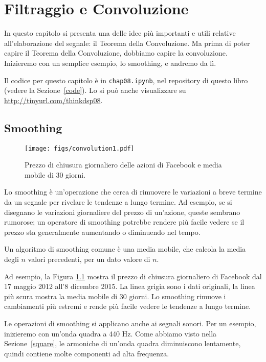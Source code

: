 \documentclass[12pt]{book} \usepackage[width=5.5in,height=8.5in, hmarginratio=3:2,vmarginratio=1:1]{geometry}
\begin{document}
\chapter{Filtraggio e Convoluzione} 

In questo capitolo si presenta una delle idee più importanti e utili relative all'elaborazione del segnale: il Teorema della Convoluzione. Ma prima di poter capire il Teorema della Convoluzione, dobbiamo capire la convoluzione. Inizieremo con un semplice esempio, lo smoothing, e andremo da lì.

Il codice per questo capitolo è in {\tt chap08.ipynb}, nel repository di questo libro (vedere la Sezione~\ref{code}). Lo si può anche visualizzare su \url{http://tinyurl.com/thinkdsp08}.

\section{Smoothing} \label{smoothing} 

\begin{figure} 

\centerline{\texttt{[image: figs/convolution1.pdf]}} \caption{Prezzo di chiusura giornaliero delle azioni di Facebook e media mobile di 30 giorni.} \label{fig.convolution1} \end{figure} 

Lo smoothing è un'operazione che cerca di rimuovere le variazioni a breve termine da un segnale per rivelare le tendenze a lungo termine. Ad esempio, se si disegnano le variazioni giornaliere del prezzo di un'azione, queste sembrano rumorose; un operatore di smoothing potrebbe rendere più facile vedere se il prezzo sta generalmente aumentando o diminuendo nel tempo.

Un algoritmo di smoothing comune è una media mobile, che calcola la media degli $n$ valori precedenti, per un dato valore di $n$.

Ad esempio, la Figura \ref{fig.convolution1} mostra il prezzo di chiusura giornaliero di Facebook dal 17 maggio 2012 all'8 dicembre 2015. La linea grigia sono i dati originali, la linea più scura mostra la media mobile di 30 giorni. Lo smoothing rimuove i cambiamenti più estremi e rende più facile vedere le tendenze a lungo termine.

Le operazioni di smoothing si applicano anche ai segnali sonori. Per un esempio, inizieremo con un'onda quadra a 440 Hz. Come abbiamo visto nella Sezione~\ref{square}, le armoniche di un'onda quadra diminuiscono lentamente, quindi contiene molte componenti ad alta frequenza.
\end{document}
